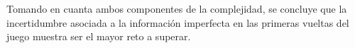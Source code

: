 Tomando en cuanta ambos componentes de la complejidad, se concluye que la
incertidumbre asociada a la información imperfecta en las primeras vueltas del
juego muestra ser el mayor reto a superar.








